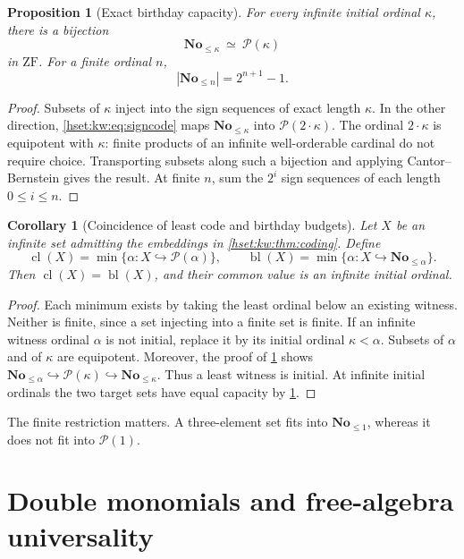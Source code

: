 \documentclass[11pt,letterpaper]{article}
\newtheorem{proposition}[proposition]{Proposition}\aliascntresetthe{proposition}
\newtheorem{corollary}[corollary]{Corollary}\aliascntresetthe{corollary}
\theoremstyle{definition}
\theoremstyle{remark}
\newcommand{\No}{\mathbf{No}}
\newcommand{\Pow}{\mathcal P}
\newcommand{\ZF}{\mathrm{ZF}}
\begin{document}
\begin{proposition}[Exact birthday capacity]\label{hset:kw:prop:capacity}
For every infinite initial ordinal $\kappa$, there is a bijection
\[
\No_{\le\kappa}\ \simeq\ \Pow(\kappa)
\]
in $\ZF$. For a finite ordinal $n$,
\[
|\No_{\le n}|=2^{n+1}-1.
\]
\end{proposition}
\begin{proof}
Subsets of $\kappa$ inject into the sign sequences of exact length $\kappa$. In the other direction, \eqref{hset:kw:eq:signcode} maps $\No_{\le\kappa}$ into $\Pow(2\cdot\kappa)$. The ordinal $2\cdot\kappa$ is equipotent with $\kappa$: finite products of an infinite well-orderable cardinal do not require choice. Transporting subsets along such a bijection and applying Cantor--Bernstein gives the result. At finite $n$, sum the $2^i$ sign sequences of each length $0\le i\le n$.
\end{proof}

\begin{corollary}[Coincidence of least code and birthday budgets]\label{hset:kw:cor:budgets}
Let $X$ be an infinite set admitting the embeddings in \cref{hset:kw:thm:coding}. Define
\[
\operatorname{cl}(X)=\min\{\alpha:X\hookrightarrow\Pow(\alpha)\},\qquad
\operatorname{bl}(X)=\min\{\alpha:X\hookrightarrow\No_{\le\alpha}\}.
\]
Then $\operatorname{cl}(X)=\operatorname{bl}(X)$, and their common value is an infinite initial ordinal.
\end{corollary}
\begin{proof}
Each minimum exists by taking the least ordinal below an existing witness. Neither is finite, since a set injecting into a finite set is finite. If an infinite witness ordinal $\alpha$ is not initial, replace it by its initial ordinal $\kappa<\alpha$. Subsets of $\alpha$ and of $\kappa$ are equipotent. Moreover, the proof of \cref{hset:kw:prop:capacity} shows $\No_{\le\alpha}\hookrightarrow\Pow(\kappa)\hookrightarrow\No_{\le\kappa}$. Thus a least witness is initial. At infinite initial ordinals the two target sets have equal capacity by \cref{hset:kw:prop:capacity}.
\end{proof}
The finite restriction matters. A three-element set fits into $\No_{\le1}$, whereas it does not fit into $\Pow(1)$.

\section{Double monomials and free-algebra universality}
\label{hset:kw:sec:independence}
\end{document}
